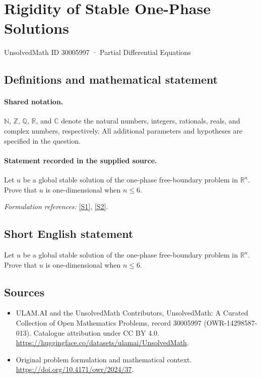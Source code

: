 \documentclass[11pt]{article}
\newcommand{\sref}[2]{\hyperlink{source:#1:#2}{[S#2]}}
\begin{document}
\setcounter{section}{30005996}
\section{Rigidity of Stable One-Phase Solutions}\label{30005997}
{\small UnsolvedMath ID 30005997 · Partial Differential Equations}
\subsection{Definitions and mathematical statement}

\paragraph{Shared notation.}$\mathbb N$, $\mathbb Z$, $\mathbb Q$, $\mathbb R$, and $\mathbb C$ denote the natural numbers, integers, rationals, reals, and complex numbers, respectively. All additional parameters and hypotheses are specified in the question.


\paragraph{Statement recorded in the supplied source.}
Let $u$ be a global stable solution of the one-phase free-boundary problem in $\mathbb R^n$. Prove that $u$ is one-dimensional when $n\leq 6$.
\par\smallskip\textit{Formulation references:} \sref{30005997}{1}, \sref{30005997}{2}.
\subsection{Short English statement}
Let $u$ be a global stable solution of the one-phase free-boundary problem in $\mathbb R^n$. Prove that $u$ is one-dimensional when $n\leq 6$.
\subsection{Sources}
\begin{itemize}
\item[\hypertarget{source:30005997:1}{S1}] ULAM.AI and the UnsolvedMath Contributors, UnsolvedMath: A Curated Collection of Open Mathematics Problems, record 30005997 (OWR-14298587-013). Catalogue attribution under CC BY 4.0.
\url{https://huggingface.co/datasets/ulamai/UnsolvedMath}.
\item[\hypertarget{source:30005997:2}{S2}] Original problem formulation and mathematical context.
\url{https://doi.org/10.4171/owr/2024/37}.
\end{itemize}
\label{end:30005997}
\end{document}
